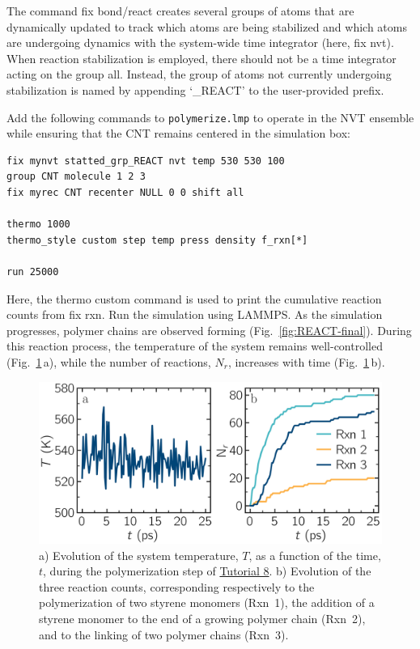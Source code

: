 \documentclass[9pt,tutorial]{livecoms}
\newcommand{\lmpcmd}[1]{\hspace{0pt}\colorbox{listing}{\textcolor{command}{\small{#1}}}\hspace{0pt}} %
\newcommand{\flecmd}[1]{\textcolor{command}{\texttt{#1}}} %
\begin{document}
\begin{note}
The command \lmpcmd{fix bond/react} creates several groups of atoms that are dynamically updated
to track which atoms are being stabilized and which atoms are undergoing
dynamics with the system-wide time integrator (here, \lmpcmd{fix nvt}).
When reaction stabilization is employed, there should not be a time integrator acting on
the group \mbox{\lmpcmd{all}.}  Instead, the group of atoms not currently
undergoing stabilization is named by appending `\_REACT' to the user-provided prefix.
\end{note}

Add the following commands to \flecmd{polymerize.lmp} to operate in the NVT ensemble
while ensuring that the CNT remains centered in the simulation box:
\begin{lstlisting}
fix mynvt statted_grp_REACT nvt temp 530 530 100
group CNT molecule 1 2 3
fix myrec CNT recenter NULL 0 0 shift all

thermo 1000
thermo_style custom step temp press density f_rxn[*]

run 25000
\end{lstlisting}
Here, the \lmpcmd{thermo custom} command is used
to print the cumulative reaction counts from \lmpcmd{fix rxn}.
Run the simulation using LAMMPS.  As the simulation progresses, polymer chains are
observed forming (Fig.~\ref{fig:REACT-final}).  During this reaction process, the
temperature of the system remains well-controlled (Fig.~\ref{fig:evolution-reacting}\,a),
while the number of reactions, $N_r$, increases with time (Fig.~\ref{fig:evolution-reacting}\,b).

\begin{figure}
\centering
\includegraphics[width=\linewidth]{REACT-reacting}
\caption{a) Evolution of the system temperature, $T$,
as a function of the time, $t$, during the polymerization step of
\hyperref[bond-react-label]{Tutorial 8}.
b) Evolution of the three reaction counts, corresponding respectively to
the polymerization of two styrene monomers (Rxn~1), the  addition of a styrene
monomer to the end of a growing polymer chain (Rxn~2), and to the linking
of two polymer chains (Rxn~3).}
\label{fig:evolution-reacting}
\end{figure}
\end{document}
